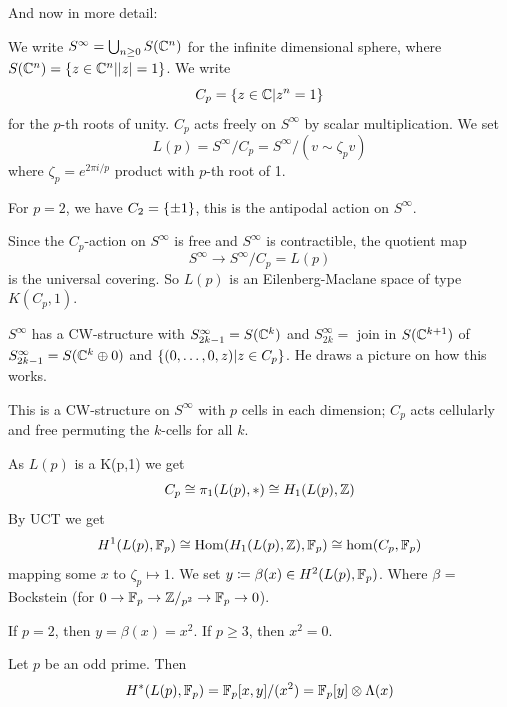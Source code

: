 \documentclass[language=english]{TemplateLecture}
\begin{document}
And now in more detail:

\begin{defi}{}{}
    We write \(S^\infty = \bigcup_{n\geq 0} S(\mathbb{C}^n)\) for the infinite dimensional sphere,
    where \(S(\mathbb{C}^n) = \{z\in \mathbb{C}^n | \lvert z\rvert = 1\}\). We write
    \[C_p = \{z\in \mathbb{C} | z^n = 1\}\]
    for the \(p\)-th roots of unity. \(C_p\) acts freely on \(S^\infty\) by scalar multiplication. We set
    \[L(p) = S^\infty/C_p = S^\infty/(v\sim \zeta_p v)\]
    where \(\zeta_p  = e^{2\pi i/p}\) product with \(p\)-th root of 1.
\end{defi}

For \(p = 2\), we have \(C_2 = \{\pm 1\}\), this is the antipodal action on \(S^\infty\). 

Since the \(C_p\)-action on \(S^\infty\) is free and \(S^\infty\) is contractible, the quotient map
\[S^\infty \to S^\infty/C_p = L(p)\]
is the universal covering. So \(L(p)\) is an Eilenberg-Maclane space of type \(K(C_p, 1)\).

\(S^\infty\) has a CW-structure with \(S^\infty_{2k-1} = S(\mathbb{C}^k)\) and \(S^\infty_{2k} = \) join in \(S(\mathbb{C}^{k+1})\) of \(S^\infty_{2k-1} = S(\mathbb{C}^k \oplus 0)\) and \(\{(0, \dots, 0, z)| z\in C_p\}\). He draws a picture on how this works.

This is a CW-structure on \(S^\infty\) with \(p\) cells in each dimension; \(C_p\) acts cellularly and free permuting the \(k\)-cells for all \(k\).

As \(L(p)\) is a K(p,1) we get
\[C_p\cong \pi_1(L(p), *) \cong H_1(L(p), \mathbb{Z})\]
By UCT we get
\[H^1(L(p), \mathbb{F}_p)\cong \operatorname{Hom}(H_1(L(p),\mathbb{Z}), \mathbb{F}_p) \cong \hom(C_p, \mathbb{F}_p)\]
mapping some \(x\) to \(\zeta_p \mapsto 1\). We set \(y \coloneq \beta(x)\in H^2(L(p), \mathbb{F}_p)\). Where \(\beta\) = Bockstein (for \(0\to \mathbb{F}_p\to \mathbb{Z}/_{p^2}\to \mathbb{F}_p\to 0\)).

If \(p = 2\), then \(y = \beta(x) = x^2\). If \(p\geq 3\), then \(x^2 = 0\).

\begin{thm}{}{}
    Let \(p\) be an odd prime. Then
    \[H^*(L(p), \mathbb{F}_p) = \mathbb{F}_p[x,y]/(x^2) = \mathbb{F}_p[y]\otimes \Lambda(x)\]
\end{thm}
\end{document}
